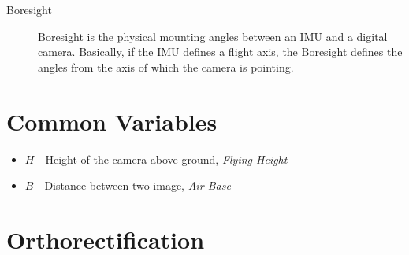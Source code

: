 \documentclass[12pt]{report}
\begin{document}
\begin{description}
\item[Boresight] Boresight is the physical mounting angles between an IMU and a digital camera. Basically, if the IMU
                 defines a flight axis,  the Boresight defines the angles from the axis of which the camera is pointing. 


\end{description}


\section*{Common Variables}

\begin{itemize}
\item $H$ - Height of the camera above ground, \emph{Flying Height}
\item $B$ - Distance between two image, \emph{Air Base}
\end{itemize}


\section*{Orthorectification}








\nocite{*}

\printindex
\end{document}
